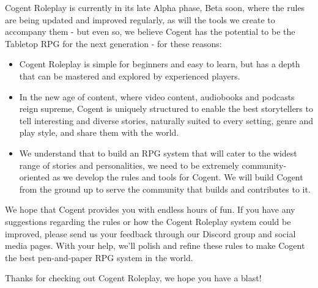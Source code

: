 Cogent Roleplay is currently in its late Alpha phase, Beta soon, where the rules are being updated and improved regularly, as will the tools we create to accompany them - but even so, we believe Cogent has the potential to be the Tabletop RPG for the next generation - for these reasons:

\begin{itemize}
    \item Cogent Roleplay is simple for beginners and easy to learn, but has a depth that can be mastered and explored by experienced players.
    \item In the new age of content, where video content, audiobooks and podcasts reign supreme, Cogent is uniquely structured to enable the best storytellers to tell interesting and diverse stories, naturally suited to every setting, genre and play style, and share them with the world.
    \item We understand that to build an RPG system that will cater to the widest range of stories and personalities, we need to be extremely community-oriented as we develop the rules and tools for Cogent. We will build Cogent from the ground up to serve the community that builds and contributes to it.
\end{itemize}

We hope that Cogent provides you with endless hours of fun. If you have any suggestions regarding the rules or how the Cogent Roleplay system could be improved, please send us your feedback through our Discord group and social media pages. With your help, we'll polish and refine these rules to make Cogent the best pen-and-paper RPG system in the world.

Thanks for checking out Cogent Roleplay, we hope you have a blast!